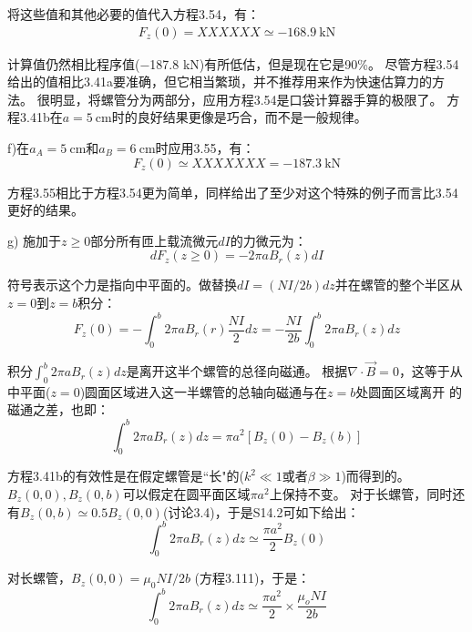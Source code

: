 将这些值和其他必要的值代入方程3.54，有：
\begin{align*}
F_z(0)= XXXXXX \simeq -168.9\ \mathrm{kN}
\end{align*}

计算值仍然相比程序值(−187.8 kN)有所低估，但是现在它是90\%。
尽管方程3.54给出的值相比3.41a要准确，但它相当繁琐，并不推荐用来作为快速估算力的方法。
很明显，将螺管分为两部分，应用方程3.54是口袋计算器手算的极限了。
方程3.41b在$a=5\ \mathrm{cm}$时的良好结果更像是巧合，而不是一般规律。

f)在$a_A=5\ \mathrm{cm}$和$a_B=6\ \mathrm{cm}$时应用3.55，有：
\begin{equation*}
F_z(0)\simeq XXXXXXX = -187.3\ \mathrm{kN}
\end{equation*}

方程3.55相比于方程3.54更为简单，同样给出了至少对这个特殊的例子而言比3.54更好的结果。

g) 施加于$z\ge 0$部分所有匝上载流微元$dI$的力微元为：
\begin{equation*}
dF_z(z\ge 0)=-2\pi a B_r(z)d I
\end{equation*}

符号表示这个力是指向中平面的。做替换$dI = (NI/2b) dz$并在螺管的整个半区从$z=0$到$z=b$积分： 
\begin{equation*}
F_{z}(0)=-\int_{0}^{b}2\pi aB_{r}(r)\frac{NI}{2}dz=-\frac{NI}{2b}\int_{0}^{b}2\pi aB_{r}(z)dz\tag{S14.1}%
\end{equation*}

积分$\int_0^b 2\pi a B_r(z)dz$是离开这半个螺管的总径向磁通。
根据$\nabla\cdot \vec{B}=0$，这等于从中平面($z=0$)圆面区域进入这一半螺管的总轴向磁通与在$z=b$处圆面区域离开
的磁通之差，也即：
\begin{equation*}
\int_{0}^{b}2\pi aB_{r}(z)dz=\pi a^{2}[B_{z}(0)-B_{z}(b)]\tag{S14.2}%
\end{equation*}

方程3.41b的有效性是在假定螺管是``长"的($k^2\ll 1$或者$\beta\gg 1$)而得到的。
$B_z(0, 0),B_z(0, b)$可以假定在圆平面区域$\pi a^2$上保持不变。
对于长螺管，同时还有$B_z(0, b)\simeq 0.5 B_z(0,0)$(讨论3.4)，于是S14.2可如下给出：
\begin{equation*}
\int_{0}^{b}2\pi aB_{r}(z)dz\simeq\frac{\pi a^{2}}{2}B_{z}(0)\tag{S14.3}%
\end{equation*}

对长螺管，$B_z(0, 0)=\mu_0 NI/2b$ (方程3.111)，于是：
\begin{equation*}
\int_{0}^{b}2\pi aB_{r}(z)dz\simeq\frac{\pi a^{2}}{2}\times\frac{\mu_{o}NI}{2b}\tag{S14.4}%
\end{equation*}

